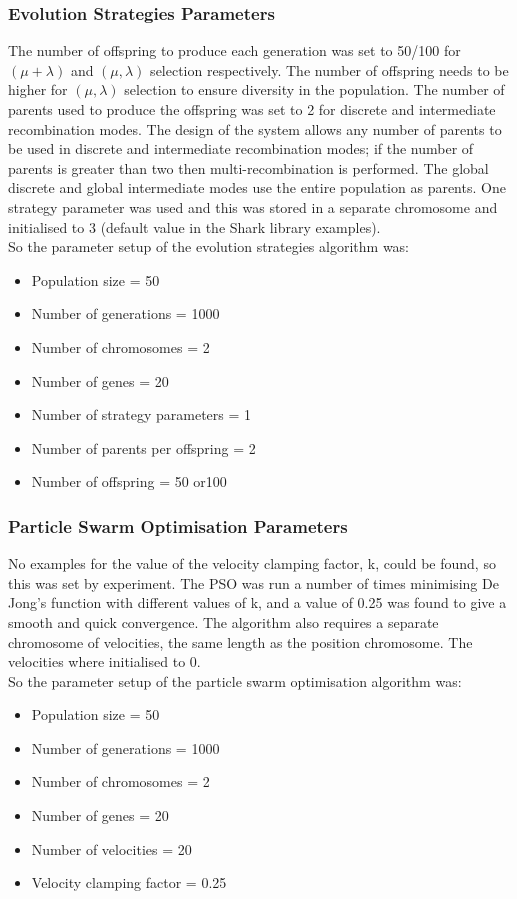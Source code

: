 \subsubsection{Evolution Strategies Parameters}
\label{sec:esparams}
The number of offspring to produce each generation was set to 50/100 for $(\mu+\lambda)$ and $(\mu,\lambda)$ selection respectively. The number of offspring needs to be higher for $(\mu,\lambda)$ selection to ensure diversity in the population. The number of parents used to produce the offspring was set to 2 for discrete and intermediate recombination modes. The design of the system allows any number of parents to be used in discrete and intermediate recombination modes; if the number of parents is greater than two then multi-recombination is performed. The global discrete and global intermediate modes use the entire population as parents. One strategy parameter was used and this was stored in a separate chromosome and initialised to 3 (default value in the Shark library examples).
\\So the parameter setup of the evolution strategies algorithm was:
\begin{itemize}
  \item{Population size = 50}
  \item{Number of generations = 1000}
  \item{Number of chromosomes = 2}
  \item{Number of genes = 20}
  \item{Number of strategy parameters = 1}
  \item{Number of parents per offspring = 2}
  \item{Number of offspring = 50 or100}
\end{itemize}

\subsubsection{Particle Swarm Optimisation Parameters}
\label{sec:psoparams}
No examples for the value of the velocity clamping factor, k, could be found, so this was set by experiment. The PSO was run a number of times minimising De Jong's function with different values of k, and a value of 0.25 was found to give a smooth and quick convergence. The algorithm also requires a separate chromosome of velocities, the same length as the position chromosome. The velocities where initialised to 0.
\\So the parameter setup of the particle swarm optimisation algorithm was:
\begin{itemize}
  \item{Population size = 50}
  \item{Number of generations = 1000}
  \item{Number of chromosomes = 2}
  \item{Number of genes = 20}
  \item{Number of velocities = 20}
  \item{Velocity clamping factor = 0.25}
\end{itemize}

